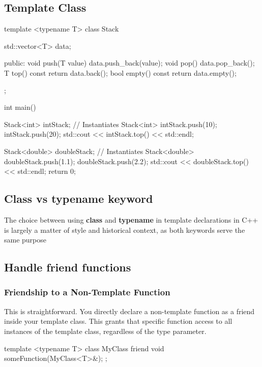 \documentclass{report}
\begin{document}
    \subsection{Template Class}
    \bigbreak \noindent 
    \begin{cppcode}
template <typename T>
class Stack {
    std::vector<T> data;

public:
    void push(T value) {
        data.push_back(value);
    }
    void pop() {
        data.pop_back();
    }
    T top() const {
        return data.back();
    }
    bool empty() const {
        return data.empty();
    }
};

int main() {
    Stack<int> intStack; // Instantiates Stack<int>
    intStack.push(10);
    intStack.push(20);
    std::cout << intStack.top() << std::endl;

    Stack<double> doubleStack; // Instantiates Stack<double>
    doubleStack.push(1.1);
    doubleStack.push(2.2);
    std::cout << doubleStack.top() << std::endl;
    return 0;
}
    \end{cppcode}










    \bigbreak \noindent 
    \subsection{Class vs typename keyword}
    \bigbreak \noindent 
    The choice between using \textbf{class} and \textbf{typename} in template declarations in C++ is largely a matter of style and historical context, as both keywords serve the same purpose

    \bigbreak \noindent 
    \subsection{Handle friend functions}
    \bigbreak \noindent 

    \subsubsection{Friendship to a Non-Template Function}
    \bigbreak \noindent 
    This is straightforward. You directly declare a non-template function as a friend inside your template class. This grants that specific function access to all instances of the template class, regardless of the type parameter.
    \bigbreak \noindent 
    \begin{cppcode}
        template <typename T>
        class MyClass {
            friend void someFunction(MyClass<T>&);
        };
    \end{cppcode}
    \bigbreak \noindent 
\end{document}
